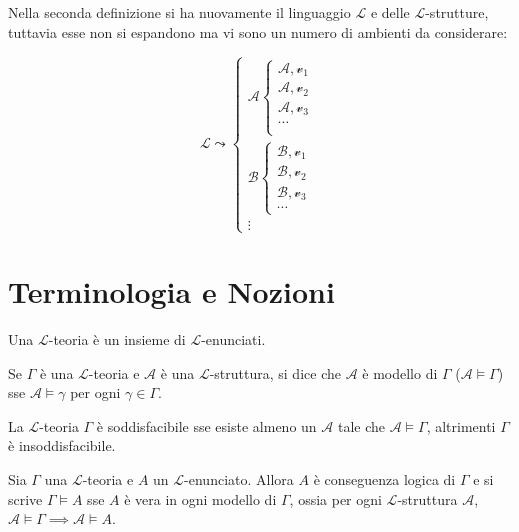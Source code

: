 Nella seconda definizione si ha nuovamente il linguaggio $\mathscr{L}$ e delle $\mathscr{L}$-strutture, 
tuttavia esse non si espandono ma vi sono un numero di ambienti da considerare: 

$$
\mathscr{L} \leadsto 
\begin{cases}
        \mathscr{A} \begin{cases}
                \mathscr{A}, \mathcal{v}_1 \\
                \mathscr{A}, \mathcal{v}_2 \\
                \mathscr{A}, \mathcal{v}_3 \\
                \cdots \\
        \end{cases} \\
        \mathscr{B} \begin{cases}
                \mathscr{B}, \mathcal{v}_1\\
                \mathscr{B}, \mathcal{v}_2\\
                \mathscr{B}, \mathcal{v}_3\\
                \cdots                     
        \end{cases} \\
        \vdots
\end{cases}
$$

\section{Terminologia e Nozioni}
\begin{defi}
Una $\mathscr{L}$-teoria è un insieme di $\mathscr{L}$-enunciati.
\end{defi}

Se $\Gamma$ è una $\mathscr{L}$-teoria e $\mathscr{A}$ è una $\mathscr{L}$-struttura, si dice che $\mathscr{A}$ è modello di $\Gamma$ ($\mathscr{A} \models \Gamma$) sse $\mathscr{A} \models \gamma$ per ogni $\gamma \in \Gamma$. 

La $\mathscr{L}$-teoria $\Gamma$ è soddisfacibile sse esiste almeno un $\mathscr{A}$ tale che $\mathscr{A} \models \Gamma$, altrimenti $\Gamma$ è insoddisfacibile.

Sia $\Gamma$ una $\mathscr{L}$-teoria e $A$ un $\mathscr{L}$-enunciato. Allora $A$ è conseguenza logica di $\Gamma$ e si scrive $\Gamma \models A$ sse $A$ è vera in ogni modello di $\Gamma$, ossia per ogni $\mathscr{L}$-struttura $\mathscr{A}$, $\mathscr{A} \models \Gamma \implies  \mathscr{A} \models A$.

